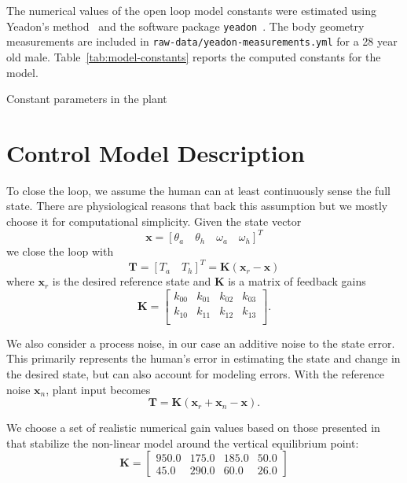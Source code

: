 \documentclass{article}
\begin{document}
The numerical values of the open loop model constants were estimated using
Yeadon's method~\cite{Yeadon1989} and the software package
\verb|yeadon|~\cite{Dembia2014}. The body geometry measurements are included in
\verb|raw-data/yeadon-measurements.yml| for a 28 year old male.
Table~\ref{tab:model-constants} reports the computed constants for the model.
%
\begin{table}
  \centering
  \caption{Constant parameters in the plant}
  
  \label{tab:model-constants}
\end{table}

\section{Control Model Description}

To close the loop, we assume the human can at least continuously sense the full
state. There are physiological reasons that back this assumption but we mostly
choose it for computational simplicity. Given the state vector
%
\begin{equation}
  \mathbf{x} = \left[ \theta_a \quad \theta_h \quad \omega_a \quad \omega_h \right]^T
\end{equation}
%
we close the loop with
%
\begin{equation}
  \mathbf{T} = \left[ T_a \quad T_h \right]^T = \mathbf{K} (\mathbf{x}_{r} - \mathbf{x})
\end{equation}
%
where $\mathbf{x}_r$ is the desired reference state and $\mathbf{K}$ is a
matrix of feedback gains
%
\begin{equation}
  \mathbf{K} =
  \begin{bmatrix}
    k_{00} & k_{01} & k_{02} & k_{03} \\
    k_{10} & k_{11} & k_{12} & k_{13} \\
  \end{bmatrix}
  .
\end{equation}

We also consider a process noise, in our case an additive noise to the state
error. This primarily represents the human's error in estimating the state and
change in the desired state, but can also account for modeling errors. With the
reference noise $\mathbf{x}_n$, plant input becomes
%
\begin{equation}
  \mathbf{T} = \mathbf{K} (\mathbf{x}_{r} + \mathbf{x}_n - \mathbf{x}).
\end{equation}

We choose a set of realistic numerical gain values based on those presented in
\cite{Park2004} that stabilize the non-linear model around the vertical
equilibrium point:
%
\begin{equation}
  \mathbf{K} =
  \begin{bmatrix}
    950.0 & 175.0 & 185.0 & 50.0 \\
    45.0 & 290.0 & 60.0 & 26.0
  \end{bmatrix}
\end{equation}
\end{document}
